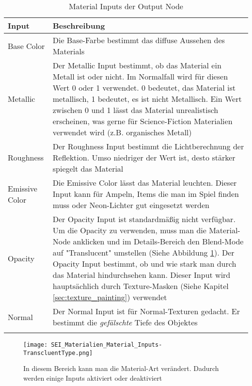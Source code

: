 \begin{longtable}{|p{4cm}|p{9.6cm}|}
    \hline
    \endfirsthead
    \textbf{Input} & \textbf{Beschreibung}\\
    \hline
    \endhead

    Base Color & Die Base-Farbe bestimmt das diffuse Aussehen des Materials \\
    \hline

    Metallic & Der Metallic Input bestimmt, ob das Material ein Metall ist oder nicht. Im Normalfall wird für
    diesen Wert 0 oder 1 verwendet. 0 bedeutet, das Material ist metallisch, 1 bedeutet, es ist nicht
    Metallisch. Ein Wert zwischen 0 und 1 lässt das Material unrealistisch erscheinen, was gerne
    für Science-Fiction Materialien verwendet wird (z.B. organisches Metall) \\
    \hline

    Roughness & Der Roughness Input bestimmt die Lichtberechnung der Reflektion. Umso niedriger der Wert
    ist, desto stärker spiegelt das Material \\
    \hline

    Emissive Color & Die Emissive Color lässt das Material leuchten. Dieser Input kann für Ampeln, Items die man im Spiel
    finden muss oder Neon-Lichter gut eingesetzt werden \\
    \hline

    Opacity & Der Opacity Input ist standardmäßig nicht verfügbar. Um die Opacity zu verwenden, muss man die
    Material-Node anklicken und im Details-Bereich den Blend-Mode auf "Translucent" umstellen (Siehe
    Abbildung \ref{picture:translucent}). Der Opacity Input bestimmt, ob und wie stark man durch das Material hindurchsehen
    kann. Dieser Input wird hauptsächlich durch Texture-Masken (Siehe Kapitel \ref{sec:texture_painting}) verwendet \\
    \hline

    Normal & Der Normal Input ist für Normal-Texturen gedacht. Er bestimmt die \textit{gefälschte} Tiefe des Objektes \\
    \hline

    \caption{Material Inputs der Output Node}
    \label{table:mat_inputs}
\end{longtable}

\begin{figure}[H]
    \centering
    \texttt{[image: SEI\_Materialien\_Material\_Inputs-TranscluentType.png]}
    \caption{In diesem Bereich kann man die Material-Art verändert. Dadurch werden einige Inputs aktiviert oder deaktiviert}
    \label{picture:translucent}
\end{figure}


